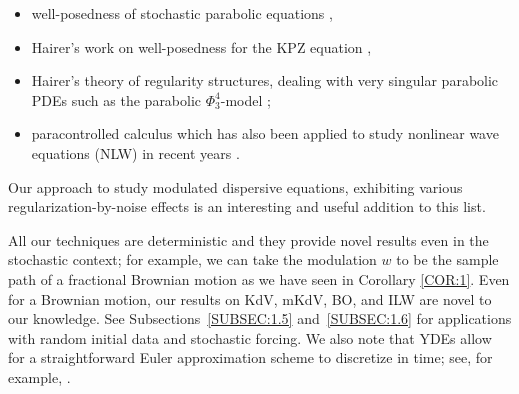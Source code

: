 \documentclass[letterpaper, 11pt,  reqno]{amsart}
\newcommand{\1}{\hspace{0.5mm}\text{I}\hspace{0.5mm}}
\newcommand{\noi}{\noindent}
\numberwithin{equation}{section}
\numberwithin{theorem}{section}
\begin{document}
\smallskip
\begin{itemize}
\item
well-posedness of stochastic parabolic  equations \cite{GT10, DGT12}, 

\smallskip
\item
Hairer's work on well-posedness for the KPZ equation \cite{Hairer1}, 


\smallskip
\item
Hairer's theory of regularity structures, 
 dealing with very singular parabolic PDEs such as the parabolic  
 $\Phi_3^4$-model \cite{Hairer2}; 


\smallskip
\item
paracontrolled calculus \cite{GIP, CK, MW}
which has also been applied 
to study  nonlinear wave equations (NLW)
in recent years
\cite{GKO2, OOT1, Bring, OOT2, BDNY}.

\end{itemize}



\noi
Our approach to study modulated dispersive equations, 
exhibiting various regularization-by-noise effects
is an interesting and useful addition to this list.







All our techniques are deterministic and they provide novel results even in the stochastic context; for example,   we can take the modulation $w$ to be the sample path of a fractional Brownian motion
as we have seen in Corollary \ref{COR:1}. 
Even for a Brownian motion, our results on KdV, mKdV, BO, and ILW are novel  to our knowledge.
See Subsections~\ref{SUBSEC:1.5} and~\ref{SUBSEC:1.6}
for applications with random initial data and stochastic forcing.
We also note that 
YDEs
allow for a straightforward Euler approximation scheme
to discretize in time; see, for example,  \cite[Subsection 2.3]{CG1}.


\medskip
\end{document}
